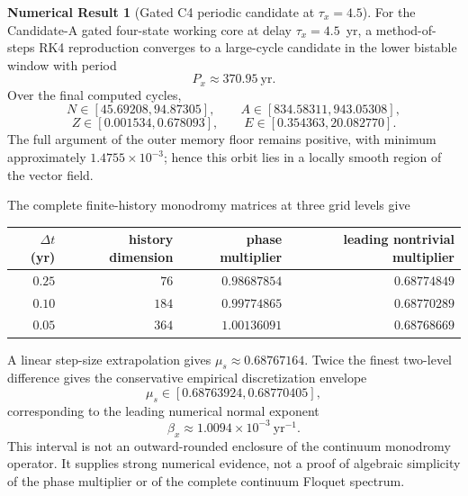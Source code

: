\documentclass[11pt]{article}
\theoremstyle{definition}
\newtheorem{numresult}{Numerical Result}
\theoremstyle{remark}
\begin{document}
\begin{numresult}[Gated C4 periodic candidate at $\tau_x=4.5$]
\label{num:c4-cycle}
For the Candidate-A gated four-state working core at delay $\tau_x=4.5$~yr, a method-of-steps RK4 reproduction converges to a large-cycle candidate in the lower bistable window with period
\[
P_x\approx370.95~\mathrm{yr}.
\]
Over the final computed cycles,
\[
N\in[45.69208,94.87305],\qquad
A\in[834.58311,943.05308],
\]
\[
Z\in[0.001534,0.678093],\qquad
E\in[0.354363,20.082770].
\]
The full argument of the outer memory floor remains positive, with minimum approximately $1.4755\times10^{-3}$; hence this orbit lies in a locally smooth region of the vector field.

The complete finite-history monodromy matrices at three grid levels give
\begin{center}
\begin{tabular}{@{}rrrr@{}}
\toprule
$\Delta t$ (yr) & history dimension & phase multiplier & leading nontrivial multiplier\\
\midrule
$0.25$ & $76$  & $0.98687854$ & $0.68774849$\\
$0.10$ & $184$ & $0.99774865$ & $0.68770289$\\
$0.05$ & $364$ & $1.00136091$ & $0.68768669$\\
\bottomrule
\end{tabular}
\end{center}
A linear step-size extrapolation gives $\mu_s\approx0.68767164$. Twice the finest two-level difference gives the conservative empirical discretization envelope
\[
\mu_s\in[0.68763924,0.68770405],
\]
corresponding to the leading numerical normal exponent
\[
\beta_x\approx1.0094\times10^{-3}~\mathrm{yr}^{-1}.
\]
This interval is not an outward-rounded enclosure of the continuum monodromy operator. It supplies strong numerical evidence, not a proof of algebraic simplicity of the phase multiplier or of the complete continuum Floquet spectrum.
\end{numresult}
\end{document}
